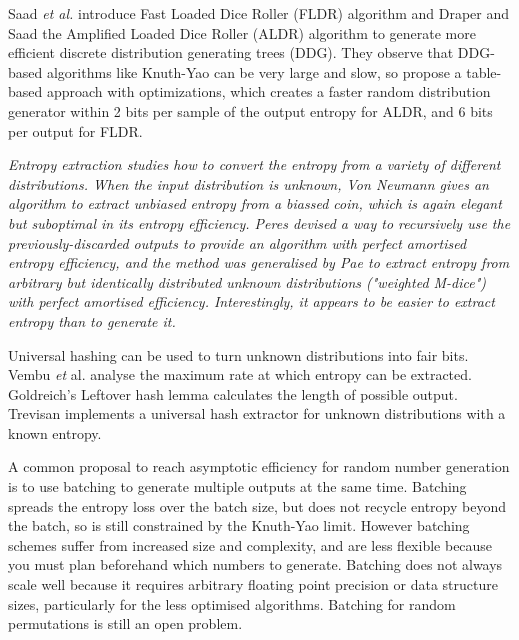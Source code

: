 \documentclass[lettersize,journal]{IEEEtran}
\begin{document}
Saad \emph{et al.} \cite{saad2020fldr} introduce Fast Loaded Dice Roller (FLDR) algorithm and Draper and Saad \cite{draper2025efficient} the Amplified Loaded Dice Roller (ALDR) algorithm to generate more efficient discrete distribution generating trees (DDG). They observe that DDG-based algorithms like Knuth-Yao can be very large and slow, so propose a table-based approach with optimizations, which creates a faster random distribution generator within 2 bits per sample of the output entropy for ALDR, and 6 bits per output for FLDR.

\em Entropy extraction \em studies how to convert the entropy \em from \em a variety of different distributions. When the input distribution is unknown, Von Neumann \cite{neumann51} gives an algorithm to extract unbiased entropy from a biassed coin, which is again elegant but suboptimal in its entropy efficiency. Peres \cite{peres1992iterating} devised a way to recursively use the previously-discarded outputs to provide an algorithm with perfect amortised entropy efficiency, and the method was generalised by Pae \cite{pae15} to extract entropy from arbitrary but identically distributed unknown distributions ("weighted M-dice") with perfect amortised efficiency. Interestingly, it appears to be easier to extract entropy than to generate it.

Universal hashing can be used to turn unknown distributions into fair bits. Vembu \emph{et} al. \cite{vembu95} analyse the maximum rate at which entropy can be extracted. Goldreich's Leftover hash lemma \cite{goldreich2004foundations} calculates the length of possible output. Trevisan \cite{trevisan2001extractors} implements a universal hash extractor for unknown distributions with a known entropy. 

A common proposal to reach asymptotic efficiency for random number generation is to use batching to generate multiple outputs at the same time. \cite{bacher2017,devroye86,han97,knuth1976complexity,kozen2022,lumbroso2013optimal} Batching spreads the entropy loss over the batch size, but does not recycle entropy beyond the batch, so is still constrained by the Knuth-Yao limit. However batching schemes suffer from increased size and complexity, and are less flexible because you must plan beforehand which numbers to generate. Batching does not always scale well because it requires arbitrary floating point precision or data structure sizes, particularly for the less optimised algorithms. Batching for random permutations is still an open problem. \cite{bacher2017}
\end{document}
